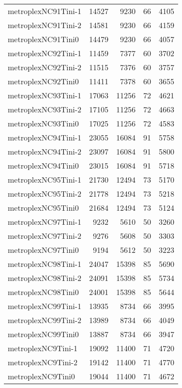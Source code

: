 \begin{longtable}{lrrrr}
metroplexNC91Tini-1 & 14527 & 9230 & 66 & 4105 \\
metroplexNC91Tini-2 & 14581 & 9230 & 66 & 4159 \\
metroplexNC91Tini0 & 14479 & 9230 & 66 & 4057 \\
metroplexNC92Tini-1 & 11459 & 7377 & 60 & 3702 \\
metroplexNC92Tini-2 & 11515 & 7376 & 60 & 3757 \\
metroplexNC92Tini0 & 11411 & 7378 & 60 & 3655 \\
metroplexNC93Tini-1 & 17063 & 11256 & 72 & 4621 \\
metroplexNC93Tini-2 & 17105 & 11256 & 72 & 4663 \\
metroplexNC93Tini0 & 17025 & 11256 & 72 & 4583 \\
metroplexNC94Tini-1 & 23055 & 16084 & 91 & 5758 \\
metroplexNC94Tini-2 & 23097 & 16084 & 91 & 5800 \\
metroplexNC94Tini0 & 23015 & 16084 & 91 & 5718 \\
metroplexNC95Tini-1 & 21730 & 12494 & 73 & 5170 \\
metroplexNC95Tini-2 & 21778 & 12494 & 73 & 5218 \\
metroplexNC95Tini0 & 21684 & 12494 & 73 & 5124 \\
metroplexNC97Tini-1 & 9232 & 5610 & 50 & 3260 \\
metroplexNC97Tini-2 & 9276 & 5608 & 50 & 3303 \\
metroplexNC97Tini0 & 9194 & 5612 & 50 & 3223 \\
metroplexNC98Tini-1 & 24047 & 15398 & 85 & 5690 \\
metroplexNC98Tini-2 & 24091 & 15398 & 85 & 5734 \\
metroplexNC98Tini0 & 24001 & 15398 & 85 & 5644 \\
metroplexNC99Tini-1 & 13935 & 8734 & 66 & 3995 \\
metroplexNC99Tini-2 & 13989 & 8734 & 66 & 4049 \\
metroplexNC99Tini0 & 13887 & 8734 & 66 & 3947 \\
metroplexNC9Tini-1 & 19092 & 11400 & 71 & 4720 \\
metroplexNC9Tini-2 & 19142 & 11400 & 71 & 4770 \\
metroplexNC9Tini0 & 19044 & 11400 & 71 & 4672 \\
\end{longtable}
